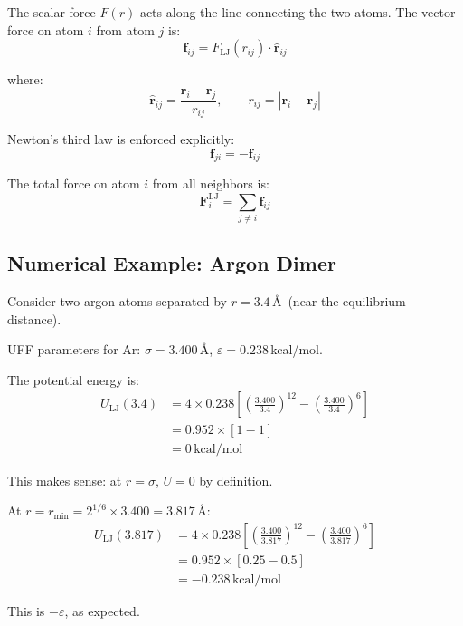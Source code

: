 \documentclass[11pt]{article}
\begin{document}
The scalar force $F(r)$ acts along the line connecting the two atoms. The vector force on atom $i$ from atom $j$ is:
\begin{equation}
\mathbf{f}_{ij} = F_{\text{LJ}}(r_{ij}) \cdot \hat{\mathbf{r}}_{ij}
\end{equation}

where:
\begin{equation}
\hat{\mathbf{r}}_{ij} = \frac{\mathbf{r}_i - \mathbf{r}_j}{r_{ij}}, \qquad r_{ij} = |\mathbf{r}_i - \mathbf{r}_j|
\end{equation}

Newton's third law is enforced explicitly:
\begin{equation}
\mathbf{f}_{ji} = -\mathbf{f}_{ij}
\end{equation}

The total force on atom $i$ from all neighbors is:
\begin{equation}
\mathbf{F}_i^{\text{LJ}} = \sum_{j \neq i} \mathbf{f}_{ij}
\end{equation}

\subsection{Numerical Example: Argon Dimer}

Consider two argon atoms separated by $r = 3.4$\,\AA\ (near the equilibrium distance).

UFF parameters for Ar: $\sigma = 3.400$\,\AA, $\varepsilon = 0.238$\,kcal/mol.

The potential energy is:
\begin{align}
U_{\text{LJ}}(3.4) &= 4 \times 0.238 \left[\left(\frac{3.400}{3.4}\right)^{12} - \left(\frac{3.400}{3.4}\right)^6\right] \\
&= 0.952 \times [1 - 1] \\
&= 0\,\text{kcal/mol}
\end{align}

This makes sense: at $r = \sigma$, $U = 0$ by definition.

At $r = r_{\min} = 2^{1/6} \times 3.400 = 3.817$\,\AA:
\begin{align}
U_{\text{LJ}}(3.817) &= 4 \times 0.238 \left[\left(\frac{3.400}{3.817}\right)^{12} - \left(\frac{3.400}{3.817}\right)^6\right] \\
&= 0.952 \times [0.25 - 0.5] \\
&= -0.238\,\text{kcal/mol}
\end{align}

This is $-\varepsilon$, as expected.
\end{document}
